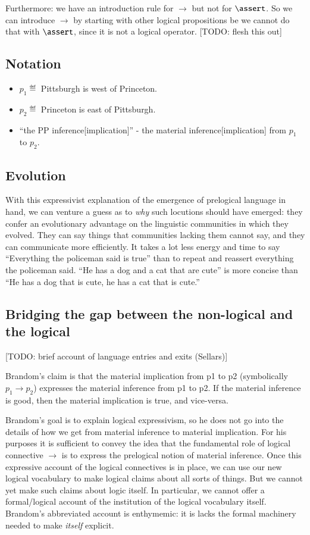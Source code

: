 \documentclass{article}
\begin{document}
Furthermore: we have an introduction rule for \(\rightarrow\) but not
for \(\linfer\). So we can introduce \(\rightarrow\) by starting with
other logical propositions be we cannot do that with \(\linfer\), since
it is not a logical operator. [TODO: flesh this out]

\subsection{Notation}
\begin{itemize}
\item \(p_1\eqdef\) Pittsburgh is west of Princeton.
\item \(p_2\eqdef\) Princeton is east of Pittsburgh.
\item ``the PP inference[implication]'' - the material
  inference[implication] from \(p_1\) to \(p_2\).
\end{itemize}

\subsection{Evolution}

With this expressivist explanation of the emergence of prelogical
language in hand, we can venture a guess as to \textit{why} such
locutions should have emerged: they confer an evolutionary advantage
on the linguistic communities in which they evolved. They can say
things that communities lacking them cannot say, and they can
communicate more efficiently. It takes a lot less energy and time to
say ``Everything the policeman said is true'' than to repeat and
reassert everything the policeman said. ``He has a dog and a cat that
are cute'' is more concise than ``He has a dog that is cute, he has a
cat that is cute.''

\subsection{Bridging the gap between the non-logical and the logical}

[TODO: brief account of language entries and exits (Sellars)]

Brandom's claim is that the material implication from p1 to p2
(symbolically \(p_1\rightarrow p_2\)) expresses the material inference
from p1 to p2. If the material inference is good, then the material
implication is true, and vice-versa.

Brandom's goal is to explain logical expressivism, so he does not go
into the details of how we get from material inference to material
implication. For his purposes it is sufficient to convey the idea that
the fundamental role of logical connective \(\rightarrow\) is to
express the prelogical notion of material inference. Once this
expressive account of the logical connectives is in place, we can use
our new logical vocabulary to make logical claims about all sorts of
things.  But we cannot yet make such claims about logic itself. In
particular, we cannot offer a formal/logical account of the
institution of the logical vocabulary itself. Brandom's abbreviated
account is enthymemic: it is lacks the formal machinery needed to make
\textit{itself} explicit.
\end{document}
